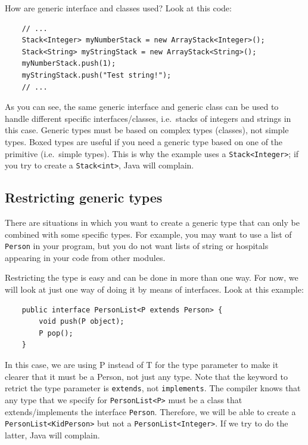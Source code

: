 How are generic interface and classes used? Look at this code:

\begin{verbatim}
    // ...
    Stack<Integer> myNumberStack = new ArrayStack<Integer>();
    Stack<String> myStringStack = new ArrayStack<String>();
    myNumberStack.push(1);
    myStringStack.push("Test string!");
    // ...
\end{verbatim}

As you can see, the same generic interface and generic class can be used to handle
different specific interfaces/classes, i.e.~stacks 
of integers and strings in this case. Generic types
must be based on complex types (classes), not simple types. Boxed
types are useful if you need a generic type based on one of the
primitive (i.e.~simple types). 
This is why the example uses a \verb+Stack<Integer>+; if you try
to create a \verb+Stack<int>+, Java will complain. 

\subsection{Restricting generic types}
\label{sec:restr-gener-types}

There are situations in which you want to create a generic type that
can only be combined with some specific types.
For example, you
may want to use a list of \verb+Person+ in your program, but you do
not want lists of string or hospitals appearing in your code from other
modules. 

Restricting the type is easy and can be done in more than one way. For
now, we will look at just one way of doing it by means of
interfaces. Look at this example:


\begin{verbatim}
    public interface PersonList<P extends Person> {
        void push(P object);
        P pop();
    }
\end{verbatim}

In this case, we are using P instead of T for the type parameter to
make it clearer that it must be a Person, not just any type. Note that
the keyword to retrict the type parameter is \verb+extends+, not
\verb+implements+. The
compiler knows that any type that we specify for \verb+PersonList<P>+
must be a class that extends/implements the interface \verb+Person+. Therefore, we will be
able to create a \verb+PersonList<KidPerson>+ but not a
\verb+PersonList<Integer>+. If we try to do the latter, Java will
complain. 

